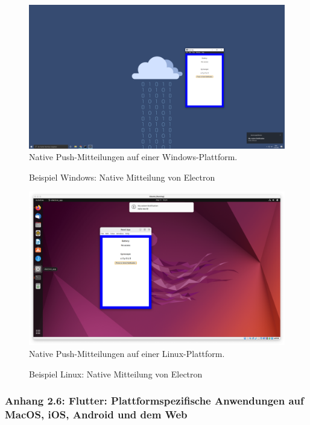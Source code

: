 \documentclass[a4paper]{scrartcl}
\begin{document}
\begin{figure}[H]
	\centering
	\caption{Beispiel Windows: Native Mitteilung von Electron}
	\includegraphics[scale=0.15]{_assets/Windows_electron.png} \\
	\justifying
	\small	
	Native Push-Mitteilungen auf einer Windows-Plattform.
\end{figure}

\begin{figure}[H]
	\centering
	\caption{Beispiel Linux: Native Mitteilung von Electron}
	\includegraphics[scale=0.2]{_assets/Linux_Electron.png} \\
	\justifying
	\small	
	Native Push-Mitteilungen auf einer Linux-Plattform.
\end{figure}

\newpage

\subsubsection*{Anhang 2.6: Flutter: Plattformspezifische Anwendungen auf MacOS, iOS, Android und dem Web}
\end{document}
